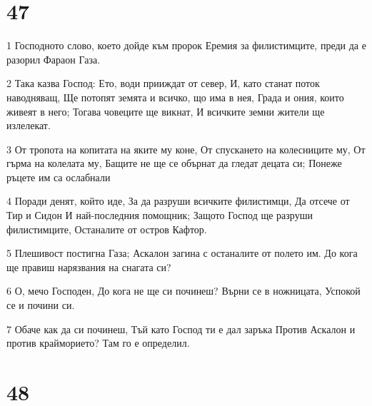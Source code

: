 \chapter{47}

\par 1 Господното слово, което дойде към пророк Еремия за филистимците, преди да е разорил Фараон Газа.
\par 2 Така казва Господ: Ето, води прииждат от север, И, като станат поток наводняващ, Ще потопят земята и всичко, що има в нея, Града и ония, които живеят в него; Тогава човеците ще викнат, И всичките земни жители ще излелекат.
\par 3 От тропота на копитата на яките му коне, От спускането на колесниците му, От гърма на колелата му, Бащите не ще се обърнат да гледат децата си; Понеже ръцете им са ослабнали
\par 4 Поради денят, който иде, За да разруши всичките филистимци, Да отсече от Тир и Сидон И най-последния помощник; Защото Господ ще разруши филистимците, Останалите от остров Кафтор.
\par 5 Плешивост постигна Газа; Аскалон загина с останалите от полето им. До кога ще правиш нарязвания на снагата си?
\par 6 О, мечо Господен, До кога не ще си починеш? Върни се в ножницата, Успокой се и почини си.
\par 7 Обаче как да си починеш, Тъй като Господ ти е дал заръка Против Аскалон и против крайморието? Там го е определил.

\chapter{48}

